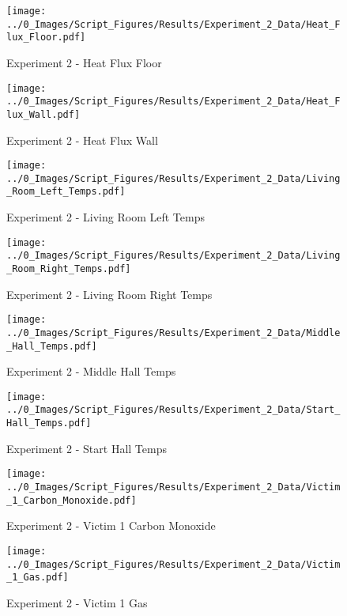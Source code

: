	\begin{figure}[H]
		\centering
		\texttt{[image: ../0\_Images/Script\_Figures/Results/Experiment\_2\_Data/Heat\_Flux\_Floor.pdf]}
		\caption[]{Experiment 2 - Heat Flux Floor}
	\end{figure}
 
	\clearpage

	\begin{figure}[H]
		\centering
		\texttt{[image: ../0\_Images/Script\_Figures/Results/Experiment\_2\_Data/Heat\_Flux\_Wall.pdf]}
		\caption[]{Experiment 2 - Heat Flux Wall}
	\end{figure}
 

	\begin{figure}[H]
		\centering
		\texttt{[image: ../0\_Images/Script\_Figures/Results/Experiment\_2\_Data/Living\_Room\_Left\_Temps.pdf]}
		\caption[]{Experiment 2 - Living Room Left Temps}
	\end{figure}
 
	\clearpage

	\begin{figure}[H]
		\centering
		\texttt{[image: ../0\_Images/Script\_Figures/Results/Experiment\_2\_Data/Living\_Room\_Right\_Temps.pdf]}
		\caption[]{Experiment 2 - Living Room Right Temps}
	\end{figure}
 

	\begin{figure}[H]
		\centering
		\texttt{[image: ../0\_Images/Script\_Figures/Results/Experiment\_2\_Data/Middle\_Hall\_Temps.pdf]}
		\caption[]{Experiment 2 - Middle Hall Temps}
	\end{figure}
 
	\clearpage

	\begin{figure}[H]
		\centering
		\texttt{[image: ../0\_Images/Script\_Figures/Results/Experiment\_2\_Data/Start\_Hall\_Temps.pdf]}
		\caption[]{Experiment 2 - Start Hall Temps}
	\end{figure}
 

	\begin{figure}[H]
		\centering
		\texttt{[image: ../0\_Images/Script\_Figures/Results/Experiment\_2\_Data/Victim\_1\_Carbon\_Monoxide.pdf]}
		\caption[]{Experiment 2 - Victim 1 Carbon Monoxide}
	\end{figure}
 
	\clearpage

	\begin{figure}[H]
		\centering
		\texttt{[image: ../0\_Images/Script\_Figures/Results/Experiment\_2\_Data/Victim\_1\_Gas.pdf]}
		\caption[]{Experiment 2 - Victim 1 Gas}
	\end{figure}
 

